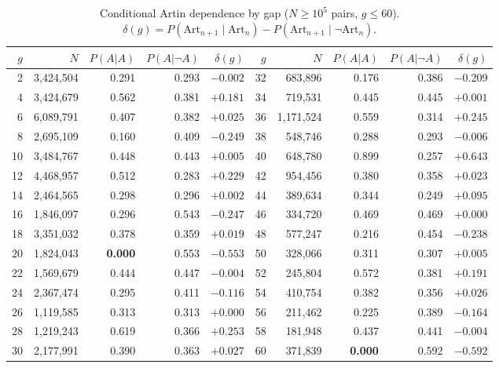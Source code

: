 \documentclass[11pt]{amsart}
\theoremstyle{definition}
\newcommand{\Art}{\mathrm{Art}}
\begin{document}
\begin{table}[ht]
	\centering
	\caption{Conditional Artin dependence by gap ($N \ge 10^5$ pairs, $g \le 60$).
		$\delta(g) = P(\Art_{n+1} \mid \Art_n) - P(\Art_{n+1} \mid \lnot\Art_n)$.}
	\label{tab:gaps}
	\small
	\begin{tabular}{rrrrr@{\qquad}rrrrr}
		\toprule
		$g$ & $N$           & $P(A|A)$       & $P(A|\lnot A)$ & $\delta(g)$ &
		$g$ & $N$           & $P(A|A)$       & $P(A|\lnot A)$ & $\delta(g)$                                                          \\
		\midrule
		2   & 3{,}424{,}504 & 0.291          & 0.293          & $-0.002$    & 32 & 683{,}896     & 0.176          & 0.386 & $-0.209$ \\
		4   & 3{,}424{,}679 & 0.562          & 0.381          & $+0.181$    & 34 & 719{,}531     & 0.445          & 0.445 & $+0.001$ \\
		6   & 6{,}089{,}791 & 0.407          & 0.382          & $+0.025$    & 36 & 1{,}171{,}524 & 0.559          & 0.314 & $+0.245$ \\
		8   & 2{,}695{,}109 & 0.160          & 0.409          & $-0.249$    & 38 & 548{,}746     & 0.288          & 0.293 & $-0.006$ \\
		10  & 3{,}484{,}767 & 0.448          & 0.443          & $+0.005$    & 40 & 648{,}780     & 0.899          & 0.257 & $+0.643$ \\
		12  & 4{,}468{,}957 & 0.512          & 0.283          & $+0.229$    & 42 & 954{,}456     & 0.380          & 0.358 & $+0.023$ \\
		14  & 2{,}464{,}565 & 0.298          & 0.296          & $+0.002$    & 44 & 389{,}634     & 0.344          & 0.249 & $+0.095$ \\
		16  & 1{,}846{,}097 & 0.296          & 0.543          & $-0.247$    & 46 & 334{,}720     & 0.469          & 0.469 & $+0.000$ \\
		18  & 3{,}351{,}032 & 0.378          & 0.359          & $+0.019$    & 48 & 577{,}247     & 0.216          & 0.454 & $-0.238$ \\
		20  & 1{,}824{,}043 & \textbf{0.000} & 0.553          & $-0.553$    & 50 & 328{,}066     & 0.311          & 0.307 & $+0.005$ \\
		22  & 1{,}569{,}679 & 0.444          & 0.447          & $-0.004$    & 52 & 245{,}804     & 0.572          & 0.381 & $+0.191$ \\
		24  & 2{,}367{,}474 & 0.295          & 0.411          & $-0.116$    & 54 & 410{,}754     & 0.382          & 0.356 & $+0.026$ \\
		26  & 1{,}119{,}585 & 0.313          & 0.313          & $+0.000$    & 56 & 211{,}462     & 0.225          & 0.389 & $-0.164$ \\
		28  & 1{,}219{,}243 & 0.619          & 0.366          & $+0.253$    & 58 & 181{,}948     & 0.437          & 0.441 & $-0.004$ \\
		30  & 2{,}177{,}991 & 0.390          & 0.363          & $+0.027$    & 60 & 371{,}839     & \textbf{0.000} & 0.592 & $-0.592$ \\
		\bottomrule
	\end{tabular}
\end{table}
\end{document}
